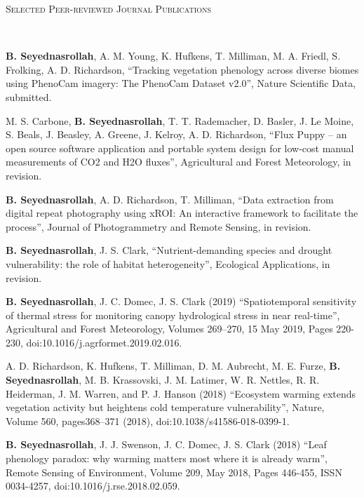 \documentclass[10pt]{article}
\newenvironment{changemargin}[2]{%
  \begin{list}{}{%
    \setlength{\topsep}{0pt}%
    \setlength{\leftmargin}{#1}%
    \setlength{\rightmargin}{#2}%
    \setlength{\listparindent}{\parindent}%
    \setlength{\itemindent}{\parindent}%
    \setlength{\parsep}{\parskip}%
  }%
  \item[]}{\end{list}
}
\newcommand{\lineover}{
	\begin{changemargin}{-0.05in}{-0.05in}
		\vspace*{-8pt}
		\hrulefill \\
		\vspace*{-2pt}
	\end{changemargin}
}
\newcommand{\header}[1]{
	\begin{changemargin}{-0.5in}{-0.5in}
		\scshape{#1}\\
  	\lineover
	\end{changemargin}
}
\newenvironment{body} {
	\vspace*{-2pt}
	\begin{changemargin}{-0.5in}{-0.5in}
  }
	{\end{changemargin}
}
\begin{document}
\medskip
\header{Selected Peer-reviewed Journal Publications}

\begin{body}
\medskip


\textbf{B. Seyednasrollah}, A. M. Young, K. Hufkens, T. Milliman, M. A. Friedl, S. Frolking, A. D. Richardson, ``Tracking vegetation phenology across diverse biomes using PhenoCam imagery: The PhenoCam Dataset v2.0'', Nature Scientific Data, submitted.\\
\medskip

M. S. Carbone, \textbf{B. Seyednasrollah}, T. T. Rademacher, D. Basler, J. Le Moine, S. Beals, J. Beasley, A. Greene, J. Kelroy, A. D. Richardson, ``Flux Puppy – an open source software application and portable system design for low-cost manual measurements of CO2 and H2O fluxes'', Agricultural and Forest Meteorology, in revision.\\
\medskip

	\textbf{B. Seyednasrollah}, A. D. Richardson, T. Milliman, ``Data extraction from digital repeat photography using xROI: An interactive framework to facilitate the process'', Journal of Photogrammetry and Remote Sensing, in revision.\\
\medskip

	\textbf{B. Seyednasrollah}, J. S. Clark, ``Nutrient-demanding species and drought vulnerability: the role of habitat heterogeneity'', Ecological Applications, in revision.\\
\medskip

	\textbf{B. Seyednasrollah}, J. C. Domec, J. S. Clark (2019) ``Spatiotemporal sensitivity of thermal stress for monitoring canopy hydrological stress in near real-time'', Agricultural and Forest Meteorology, Volumes 269–270, 15 May 2019, Pages 220-230, doi:10.1016/j.agrformet.2019.02.016.\\
\medskip


	A. D. Richardson, K. Hufkens, T. Milliman, D. M. Aubrecht, M. E. Furze, \textbf{B. Seyednasrollah}, M. B. Krassovski, J. M. Latimer, W. R. Nettles, R. R. Heiderman, J. M. Warren, and P. J. Hanson (2018) ``Ecosystem warming extends vegetation activity but heightens cold temperature vulnerability'', Nature, Volume 560, pages368–371 (2018), doi:10.1038/s41586-018-0399-1.\\
\medskip

	\textbf{B. Seyednasrollah}, J. J. Swenson, J. C. Domec, J. S. Clark (2018) ``Leaf phenology paradox: why warming matters most where it is already warm'', Remote Sensing of Environment, Volume 209, May 2018, Pages 446-455, ISSN 0034-4257, doi:10.1016/j.rse.2018.02.059.\\
\medskip


\end{body}
\end{document}
